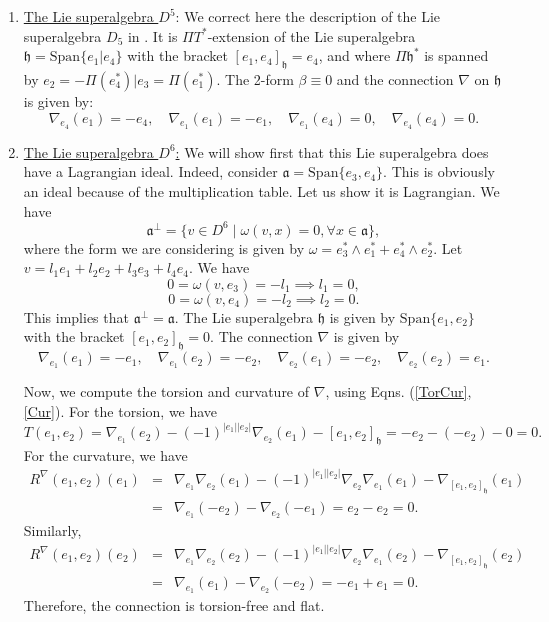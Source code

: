 \documentclass[12pt]{amsart}
\begin{document}
\begin{enumerate}
    \item \underline{The Lie superalgebra $D^5$}: We correct here the description of the  Lie superalgebra $D_5$ in \cite{BM}. It is  $\Pi T^*$-extension of the Lie superalgebra $\mathfrak{h}=\mathrm{Span}\{e_1 | e_4\}$ with the bracket $[e_1,e_4]_{\mathfrak{h}} = e_4$, and where $\Pi \mathfrak{h}^*$ is spanned by $e_2 = -\Pi(e_4^*) | e_3 = \Pi(e_1^*)$. The 2-form $\beta \equiv 0$ and the connection $\nabla$ on $\mathfrak{h}$ is given by:
\[\nabla_{e_4}(e_1) = -e_4,\quad  \nabla_{e_1}(e_1) = -e_1, \quad  \nabla_{e_1}(e_4) = 0, \quad \nabla_{e_4}(e_4) = 0.\]

    \item \underline{The Lie superalgebra $D^6$:} We will  show first that this Lie superalgebra does have a Lagrangian ideal. Indeed, consider $\mathfrak{a}=\mathrm{Span}\{e_3, e_4 \} $. This is obviously an ideal because of the multiplication table. Let us show it is Lagrangian. We have
    \[\mathfrak{a}^{\bot}=\{v\in D^6 \;|\; \omega(v, x)=0, \forall x\in \mathfrak{a} \}, \]
    where the form we are considering is given by  $\omega=e_3^*\wedge e_1^* + e_4^*\wedge e_2^* $. 
    Let $v=l_1e_1+l_2e_2+l_3e_3+l_4e_4$. We have 
    \[ 0 = \omega(v,e_3)= -l_1 \implies l_1=0,\]
    \[ 0 = \omega(v,e_4)= -l_2 \implies l_2=0.\]
    This implies that $\mathfrak{a}^{\bot}=\mathfrak{a}$. The Lie superalgebra $\mathfrak h$ is given by $\mathrm{Span}\{e_1 , e_2\}$ with the bracket $[e_1,e_2]_{\mathfrak{h}} = 0$. The connection $\nabla$ is given by
     \[
     \nabla_{e_1}(e_1) = -e_1,\quad  \nabla_{e_1}(e_2) = -e_2, \quad  \nabla_{e_2}(e_1) = -e_2, \quad \nabla_{e_2}(e_2) = e_1.
     \]

    
    Now, we compute the torsion and curvature of $\nabla$, using Eqns. (\ref{TorCur}, \ref{Cur}). For the torsion, we have
    \[ 
T(e_1,e_2) = \nabla_{e_1}(e_2) -(-1)^{|e_1||e_2|}\nabla_{e_2} (e_1) - [e_1,e_2]_{\mathfrak h} =
    -e_2-(-e_2)-0=0.
    \]
    For the curvature, we have   
    \[ 
    \begin{array}{lcl} R^\nabla(e_1,e_2)(e_1) & = &  \nabla _{e_1} \nabla_{e_2} (e_1)-(-1)^{|e_1||e_2|}\nabla_{e_2} \nabla_{e_1} (e_1) - \nabla_{[e_1,e_2]_{\mathfrak h}}(e_1)\\[2mm]
    &= & \nabla_{e_1}(-e_2)-\nabla_{e_2}(-e_1)=e_2-e_2=0.
    \end{array}
    \]
    Similarly, 
    \[ \begin{array}{lcl}
    R^\nabla(e_1,e_2)(e_2) & = & \nabla _{e_1} \nabla_{e_2} (e_2)-(-1)^{|e_1||e_2|}\nabla_{e_2} \nabla_{e_1} (e_2) - \nabla_{[e_1,e_2]_{\mathfrak h}}(e_2)\\[2mm]
    & = & 
    \nabla_{e_1}(e_1)-\nabla_{e_2}(-e_2)=-e_1+e_1=0.
    \end{array}
    \]
  Therefore, the connection is torsion-free and flat.
    

\end{enumerate}
\end{document}
